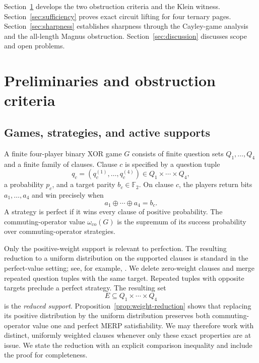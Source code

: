 \documentclass[11pt]{article}
\theoremstyle{definition}
\theoremstyle{remark}
\newcommand{\co}{\mathrm{co}}
\numberwithin{equation}{section}
\begin{document}
Section~\ref{sec:preliminaries} develops the two obstruction criteria and the
Klein witness.  Section~\ref{sec:sufficiency} proves exact circuit lifting for
four ternary pages.  Section~\ref{sec:sharpness} establishes sharpness through
the Cayley-game analysis and the all-length Magnus obstruction.
Section~\ref{sec:discussion} discusses scope and open problems.

\section{Preliminaries and obstruction criteria}\label{sec:preliminaries}

\subsection{Games, strategies, and active supports}

A finite four-player binary XOR game \(G\) consists of finite question sets
\(Q_1,\ldots,Q_4\) and a finite family of clauses.  Clause \(c\) is specified
by a question tuple
\[
  q_c=(q_c^{(1)},\ldots,q_c^{(4)})
  \in Q_1\times\cdots\times Q_4,
\]
a probability \(p_c\), and a target parity \(b_c\in\mathbb F_2\).  On clause
\(c\), the players return bits \(a_1,\ldots,a_4\) and win precisely when
\[
  a_1\oplus\cdots\oplus a_4=b_c.
\]
A strategy is perfect if it wins every clause of positive probability.  The
commuting-operator value \(\omega_{\co}(G)\) is the supremum of its success
probability over commuting-operator strategies.

Only the positive-weight support is relevant to perfection.  The resulting
reduction to a uniform distribution on the supported clauses is standard in
the perfect-value setting; see, for example,
\cite[Sec.~2.1.1]{WattsHelton2023}.  We delete zero-weight clauses and merge
repeated question tuples with the same target.  Repeated tuples with opposite
targets preclude a perfect strategy.  The resulting set
\[
  E\subseteq Q_1\times\cdots\times Q_4
\]
is the \emph{reduced support}.  Proposition~\ref{prop:weight-reduction} shows
that replacing its positive distribution by the uniform distribution
preserves both commuting-operator value one and perfect MERP satisfiability.
We may therefore work with distinct, uniformly weighted clauses whenever
only these exact properties are at issue.  We state the reduction with an
explicit comparison inequality and include the proof for completeness.
\end{document}
